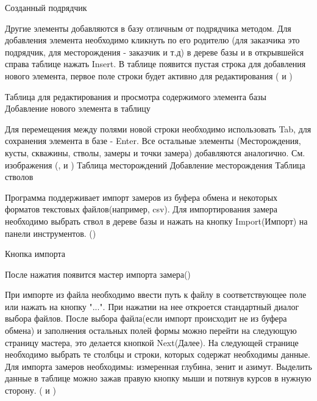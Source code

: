 {Созданный подрядчик}

Другие элементы добавляются в базу отличным от подрядчика методом. Для добавления элемента необходимо кликнуть по его родителю
(для заказчика это подрядчик, для месторождения - заказчик и т.д) в дереве базы и в открывшейся справа таблице нажать Insert.
В таблице появится пустая строка для добавления нового элемента, первое поле строки будет активно для редактирования
( и )

{Таблица для редактирования и просмотра содержимого элемента базы}
{Добавление нового элемента в таблицу}

Для перемещения между полями новой строки необходимо использовать Tab, для сохранения элемента в базе - Enter. Все остальные элементы
(Месторождения, кусты, скважины, стволы, замеры и точки замера) добавляются аналогично. См. изображения
(,  и )
{Таблица месторождений}
{Добавление месторождения}
{Таблица стволов}

Программа поддерживает импорт замеров из буфера обмена и некоторых форматов текстовых файлов(например, csv).
Для импортирования замера необходимо выбрать ствол в дереве базы и нажать на кнопку Import(Импорт) на панели инструментов.
()

{Кнопка импорта}

После нажатия появится мастер импорта замера()


При импорте из файла необходимо ввести путь к файлу в соответствующее поле или нажать на кнопку "...".
При нажатии на нее откроется стандартный диалог выбора файлов. После выбора файла(если импорт происходит не из буфера обмена) и
заполнения остальных полей формы можно перейти на следующую страницу мастера, это делается кнопкой Next(Далее).
На следующей странице необходимо выбрать те столбцы и строки, которых содержат необходимы данные. Для импорта замеров необходимы: измеренная глубина, зенит и азимут.
Выделить данные в таблице можно зажав правую кнопку мыши и потянув курсов в нужную сторону.
( и )

